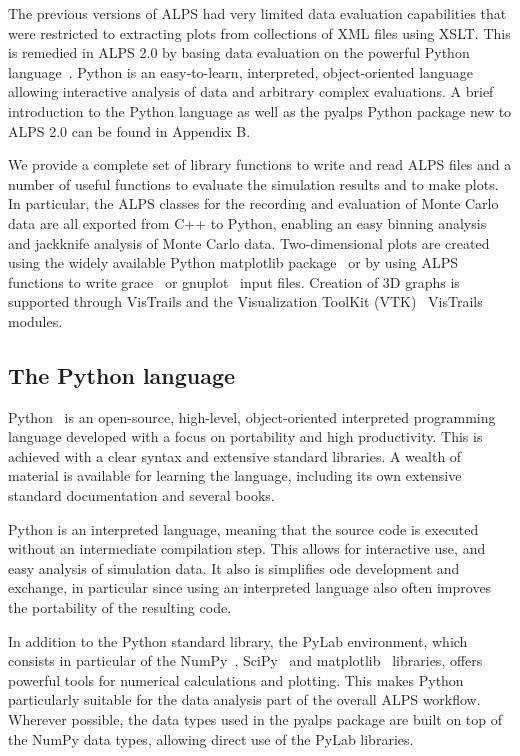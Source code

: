 \documentclass[12pt]{iopart}
\begin{document}
\medskip

The previous versions of ALPS had very limited data evaluation capabilities that were restricted to extracting plots from collections of XML files using XSLT. This is remedied in ALPS 2.0 by basing data evaluation on the powerful Python language~\cite{python}. Python is an easy-to-learn, interpreted, object-oriented language allowing interactive analysis of data and arbitrary complex evaluations. A brief introduction to the Python language as well as the pyalps Python package new to ALPS 2.0 can be found in Appendix B.

We provide a complete set of library functions to write and read ALPS files and a number of useful functions to evaluate the simulation results and to make plots. In particular, the ALPS classes for the recording and evaluation of Monte Carlo data are all exported from C++ to Python, enabling an easy binning analysis~\cite{Ambegaokar2010} and jackknife analysis of Monte Carlo data.
Two-dimensional plots are created using the widely available Python matplotlib package~\cite{matplotlib} or by using ALPS functions to write grace~\cite{grace} or gnuplot~\cite{gnuplot} input files. Creation of 3D graphs is supported through VisTrails and the Visualization ToolKit (VTK)~\cite{vtk} VisTrails modules.

\subsection{The Python language}

Python~\cite{python} is an open-source, high-level, object-oriented interpreted programming language developed with a focus on portability and high productivity. This is achieved with a clear syntax and extensive standard libraries. A wealth of material is available for learning the language, including its own extensive standard documentation and several books\cite{LearningPython, ProgrammingPython}.

Python is an interpreted language, meaning that the source code is executed without an intermediate compilation step. This allows for interactive use, and easy analysis of simulation data. It also is simplifies ode development and exchange, in particular since using an interpreted language also often improves the portability of the resulting code.

In addition to the Python standard library, the PyLab environment, which consists in particular of the NumPy~\cite{numpy}, SciPy~\cite{scipy} and matplotlib~\cite{matplotlib} libraries, offers powerful tools for numerical calculations and plotting. This makes Python particularly suitable for the data analysis part of the overall ALPS workflow. Wherever possible, the data types used in the pyalps package are built on top of the NumPy data types, allowing direct use of the PyLab libraries.
\end{document}

